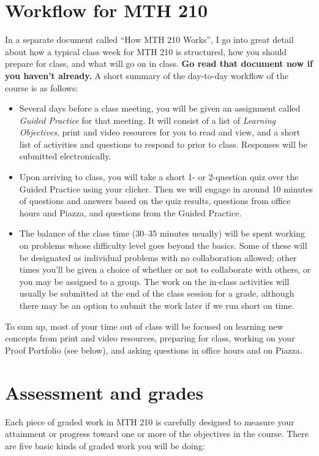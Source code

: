 \documentclass[11pt]{article}
\begin{document}
\section*{Workflow for MTH 210}

In a separate document called ``How MTH 210 Works'', I go into great detail about how a typical class week for MTH 210 is structured, how you should prepare for class, and what will go on in class. \textbf{Go read that document now if you haven't already.} A short summary of the day-to-day workflow of the course is as follows: 
\begin{itemize}[itemsep=0pt]
	\item Several days before a class meeting, you will be given an assignment called \emph{Guided Practice} for that meeting. It will consist of a list of \emph{Learning Objectives}, print and video resources for you to read and view, and a short list of activities and questions to respond to prior to class. Responses will be submitted electronically. 
	\item Upon arriving to class, you will take a short 1- or 2-question quiz over the Guided Practice using your clicker. Then we will engage in around 10 minutes of questions and answers based on the quiz results, questions from office hours and Piazza, and questions from the Guided Practice. 
	\item The balance of the class time (30--35 minutes usually) will be spent working on problems whose difficulty level goes beyond the basics. Some of these will be designated as individual problems with no collaboration allowed; other times you'll be given a choice of whether or not to collaborate with others, or you may be assigned to a group. The work on the in-class activities will usually be submitted at the end of the class session for a grade, although there may be an option to submit the work later if we run short on time. 
\end{itemize} 

To sum up, most of your time out of class will be focused on learning new concepts from print and video resources, preparing for class, working on your Proof Portfolio (see below), and asking questions in office hours and on Piazza. 

	
\section*{Assessment and grades}

Each piece of graded work in MTH 210 is carefully designed to measure your attainment or progress toward one or more of the objectives in the course. There are five basic kinds of graded work you will be doing: 
\end{document}
